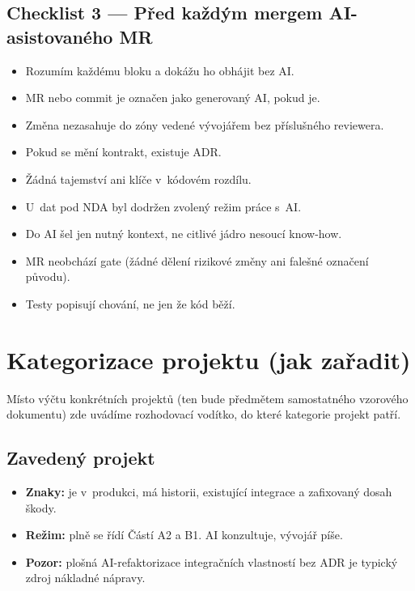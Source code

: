 \subsection{Checklist 3 --- Před každým mergem AI-asistovaného MR}

\begin{itemize}[label={}]
\item \cb Rozumím každému bloku a dokážu ho obhájit bez AI.
\item \cb MR nebo commit je označen jako generovaný AI, pokud je.
\item \cb Změna nezasahuje do zóny vedené vývojářem bez příslušného reviewera.
\item \cb Pokud se mění kontrakt, existuje ADR.
\item \cb Žádná tajemství ani klíče v~kódovém rozdílu.
\item \cb U~dat pod NDA byl dodržen zvolený režim práce s~AI.
\item \cb Do AI šel jen nutný kontext, ne citlivé jádro nesoucí know-how.
\item \cb MR neobchází gate (žádné dělení rizikové změny ani falešné označení původu).
\item \cb Testy popisují chování, ne jen že kód běží.
\end{itemize}

\section{Kategorizace projektu (jak zařadit)}

Místo výčtu konkrétních projektů (ten bude předmětem samostatného vzorového dokumentu) zde uvádíme rozhodovací vodítko, do které kategorie projekt patří.

\subsection{Zavedený projekt}

\begin{itemize}
\item \textbf{Znaky:} je v~produkci, má historii, existující integrace a zafixovaný dosah škody.
\item \textbf{Režim:} plně se řídí Částí A2 a B1. AI konzultuje, vývojář píše.
\item \textbf{Pozor:} plošná AI-refaktorizace integračních vlastností bez ADR je typický zdroj nákladné nápravy.
\end{itemize}

